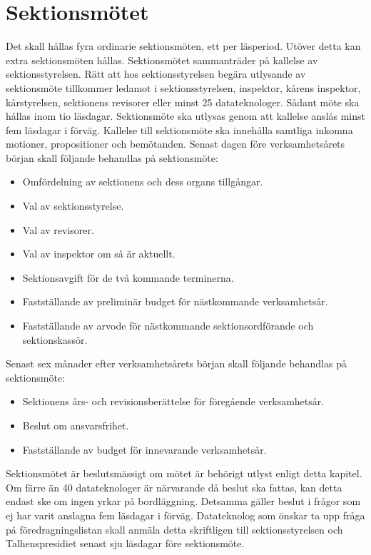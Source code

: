 \documentclass[a4paper]{dteklag}
\begin{document}
\section{Sektionsmötet}
\para[Sammanträden] Det skall hållas fyra ordinarie sektionsmöten, ett per läsperiod. Utöver detta kan extra sektionsmöten hållas.
\para Sektionsmötet sammanträder på kallelse av sektionsstyrelsen.
\para Rätt att hos sektionsstyrelsen begära utlysande av sektionsmöte tillkommer ledamot i sektionsstyrelsen, inspektor, kårens inspektor, kårstyrelsen, sektionens revisorer eller minst 25 datateknologer. Sådant möte ska hållas inom tio läsdagar.
\para Sektionsmöte ska utlysas genom att kallelse anslås minst fem läsdagar i förväg.
\para Kallelse till sektionsmöte ska innehålla samtliga inkomna motioner, propositioner och bemötanden.
\para[Åligganden] Senast dagen före verksamhetsårets början skall följande behandlas på sektionsmöte:
\begin{itemize}
\item Omfördelning av sektionens och dess organs tillgångar.
\item Val av sektionsstyrelse.
\item Val av revisorer.
\item Val av inspektor om så är aktuellt.
\item Sektionsavgift för de två kommande terminerna.
\item Fastställande av preliminär budget för nästkommande verksamhetsår.
\item Fastställande av arvode för nästkommande sektionsordförande och sektionskassör.
\end{itemize}
\para Senast sex månader efter verksamhetsårets början skall följande behandlas på sektionsmöte:
\begin{itemize}
\item Sektionens års- och revisionsberättelse för föregående verksamhetsår.
\item Beslut om ansvarsfrihet.
\item Fastställande av budget för innevarande verksamhetsår.
\end{itemize}
\para[Beslutförhet] Sektionsmötet är beslutsmässigt om mötet är behörigt utlyst enligt detta kapitel.
\stycke
Om färre än 40 datateknologer är närvarande då beslut ska fattas, kan detta endast ske om ingen yrkar på bordläggning.
\stycke Detsamma gäller beslut i frågor som ej har varit anslagna fem läsdagar i förväg.
\para[Motion] Datateknolog som önskar ta upp fråga på föredragningslistan skall anmäla detta skriftligen till sektionsstyrelsen och Talhenspresidiet senast sju läsdagar före sektionsmöte.
\end{document}
